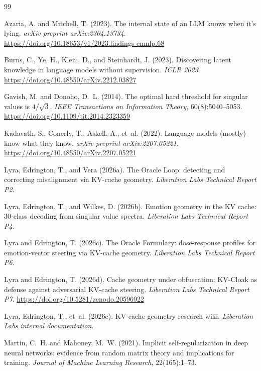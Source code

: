 \documentclass[11pt,a4paper]{article}
\begin{document}
\begin{thebibliography}{99}

Azaria, A. and Mitchell, T. (2023).
The internal state of an LLM knows when it's lying.
\textit{arXiv preprint arXiv:2304.13734}.
\url{https://doi.org/10.18653/v1/2023.findings-emnlp.68}

Burns, C., Ye, H., Klein, D., and Steinhardt, J. (2023).
Discovering latent knowledge in language models without supervision.
\textit{ICLR 2023}.
\url{https://doi.org/10.48550/arXiv.2212.03827}

Gavish, M. and Donoho, D.~L. (2014).
The optimal hard threshold for singular values is $4/\sqrt{3}$.
\textit{IEEE Transactions on Information Theory}, 60(8):5040--5053.
\url{https://doi.org/10.1109/tit.2014.2323359}

Kadavath, S., Conerly, T., Askell, A., et~al. (2022).
Language models (mostly) know what they know.
\textit{arXiv preprint arXiv:2207.05221}.
\url{https://doi.org/10.48550/arXiv.2207.05221}

Lyra, Edrington, T., and Vera (2026a).
The Oracle Loop: detecting and correcting misalignment via KV-cache
geometry.
\textit{Liberation Labs Technical Report P2}.

Lyra, Edrington, T., and Wilkes, D. (2026b).
Emotion geometry in the KV cache: 30-class decoding from singular
value spectra.
\textit{Liberation Labs Technical Report P4}.

Lyra and Edrington, T. (2026c).
The Oracle Formulary: dose-response profiles for emotion-vector
steering via KV-cache geometry.
\textit{Liberation Labs Technical Report P6}.

Lyra and Edrington, T. (2026d).
Cache geometry under obfuscation: KV-Cloak as defense against
adversarial KV-cache steering.
\textit{Liberation Labs Technical Report P7}.
\url{https://doi.org/10.5281/zenodo.20596922}

Lyra, Edrington, T., et~al. (2026e).
KV-cache geometry research wiki.
\textit{Liberation Labs internal documentation}.

Martin, C.~H. and Mahoney, M.~W. (2021).
Implicit self-regularization in deep neural networks: evidence from
random matrix theory and implications for training.
\textit{Journal of Machine Learning Research}, 22(165):1--73.


\end{thebibliography}
\end{document}
